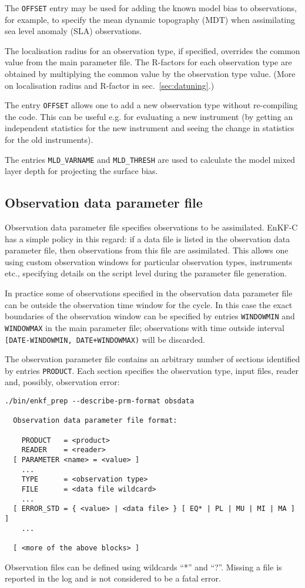 \documentclass[11pt]{report}
\begin{document}
The \verb|OFFSET| entry may be used for adding the known model bias to observations, for example, to specify the mean dynamic topography (MDT) when assimilating sea level anomaly (SLA) observations.

The localisation radius for an observation type, if specified, overrides the
common value from the main parameter file.
The R-factors for each observation type are obtained by multiplying the common
value by the observation type value.
(More on localisation radius and R-factor in sec.~\ref{sec:datuning}.)

The entry \verb|OFFSET| allows one to add a new observation type without re-compiling the code.
This can be useful e.g. for evaluating a new instrument (by getting an independent statistics for the new instrument and seeing the change in statistics for the old instruments).

The entries \verb|MLD_VARNAME| and \verb|MLD_THRESH| are used to calculate the model mixed layer depth for projecting the surface bias.

\subsection{Observation data parameter file}

Observation data parameter file specifies observations to be assimilated.
EnKF-C has a simple policy in this regard: if a data file is listed in the observation data parameter file, then observations from this file are assimilated.
This allows one using custom observation windows for particular observation types, instruments etc., specifying details on the script level during the parameter file generation.

In practice some of observations specified in the observation data parameter file can be outside the observation time window for the cycle.
In this case the exact boundaries of the observation window can be specified by entries \verb|WINDOWMIN| and \verb|WINDOWMAX| in the main parameter file;
observations with time outside interval \verb|[DATE-WINDOWMIN, DATE+WINDOWMAX)| will be discarded.

The observation parameter file contains an arbitrary number of sections identified by entries \verb|PRODUCT|.
Each section specifies the observation type, input files, reader and, possibly, observation error:
\begin{Verbatim}[frame=single,fontsize=\footnotesize]
./bin/enkf_prep --describe-prm-format obsdata

  Observation data parameter file format:

    PRODUCT   = <product>
    READER    = <reader>
  [ PARAMETER <name> = <value> ]
    ...
    TYPE      = <observation type>
    FILE      = <data file wildcard> 
    ...
  [ ERROR_STD = { <value> | <data file> } [ EQ* | PL | MU | MI | MA ] ]
    ...

  [ <more of the above blocks> ]
\end{Verbatim}
Observation files can be defined using wildcards ``*'' and ``?''.
Missing a file is reported in the log and is not considered to be a fatal error.
\end{document}

